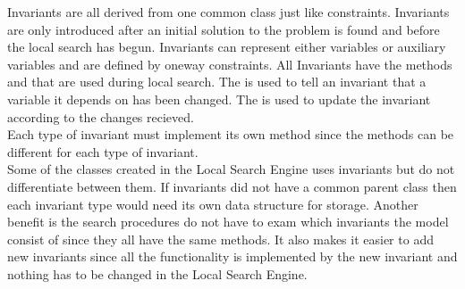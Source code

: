 Invariants are all derived from one common class just like constraints. Invariants are only introduced after an initial 
solution to the problem is found and before the local search has begun. Invariants can represent either variables or 
auxiliary variables and are defined by oneway constraints. All Invariants have the methods  and 
 that are used during local search. The  is used to tell an invariant that a 
variable it depends on has been changed. The  is used to update the invariant according to the 
changes recieved. \\ 
Each type of invariant must implement its own method since the methods can be different for each type of invariant. \\ 
Some of the classes created in the Local Search Engine uses invariants but do not differentiate between them. If 
invariants did not have a common parent class then each invariant type would need its own data structure for storage. 
Another benefit is the search procedures do not have to exam which invariants the model consist of since they all have 
the same methods. It also makes it easier to add new invariants since all the functionality is implemented by the new 
invariant and nothing has to be changed in the Local Search Engine. \\ 
 

